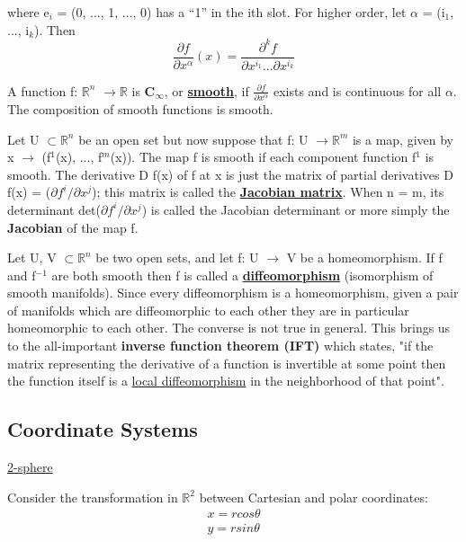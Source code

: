 where e$_i$ = (0, ..., 1, ..., 0) has a “1” in the ith slot. For higher order, let $\alpha$ = (i$_1$, ..., i$_k$). Then
\begin{equation}
    \frac{\partial f}{\partial x^\alpha} (x) = \frac{\partial^k f}{\partial x^{i_1} ... \partial x^{i_k}}
\end{equation}

A function f: $\mathbb{R}^n$ $\rightarrow \mathbb{R}$ is \textbf{C$_\infty$}, or \href{https://en.wikipedia.org/wiki/Smoothness}{\textbf{smooth}}, 
if $\frac{\partial f}{\partial x^\alpha}$ exists and is continuous for
all $\alpha$. The composition of smooth functions is smooth.

Let U $\subset \mathbb{R}^n$ be an open set but now suppose that f: U $\rightarrow \mathbb{R}^m$ is a map,
given by x $\rightarrow$ (f$^1$(x), ..., f$^m$(x)). The map f is smooth if each component
function f$^1$ is smooth. The derivative D f(x) of f at x is just the matrix of partial
derivatives D f(x) = ($\partial f^i / \partial x^j$); this matrix is called the \href{https://en.wikipedia.org/wiki/Jacobian_matrix_and_determinant}{\textbf{Jacobian matrix}}.
When n = m, its determinant det($\partial f^i / \partial x^j$) is called the Jacobian determinant or more
simply the \textbf{Jacobian} of the map f.

Let U, V $\subset \mathbb{R}^n$ be two open sets, and let f: U $\rightarrow$ V be a homeomorphism.
If f and f$^{-1}$ are both smooth then f is called a \href{https://en.wikipedia.org/wiki/Diffeomorphism}{\textbf{diffeomorphism}} (isomorphism of smooth manifolds).
Since every diffeomorphism is a homeomorphism, given a pair of manifolds which are diffeomorphic to each other they are in particular homeomorphic to each other. 
The converse is not true in general. This brings us to the all-important \textbf{inverse function theorem (IFT)} which states, "if the matrix
representing the derivative of a function is invertible at some point then the function
itself is a \href{https://en.wikipedia.org/wiki/Local_diffeomorphism}{local diffeomorphism} in the neighborhood of that point".

\subsection{Coordinate Systems}
\href{https://en.wikipedia.org/wiki/N-sphere}{2-sphere}

Consider the transformation in $\mathbb{R}^2$ between Cartesian and polar coordinates:
\begin{equation}
    \begin{aligned}
        x = r cos\theta \\
        y = r sin \theta
    \end{aligned}
\end{equation}


